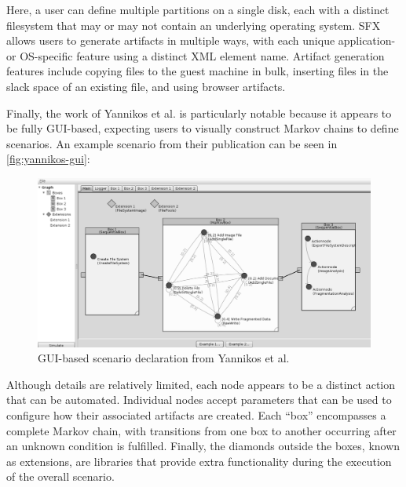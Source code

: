 \documentclass[letterpaper,12pt]{report}
\begin{document}
Here, a user can define multiple partitions on a single disk, each with
a distinct filesystem that may or may not contain an underlying
operating system. SFX allows users to generate artifacts in multiple
ways, with each unique application- or OS-specific feature using a
distinct XML element name. Artifact generation features include copying
files to the guest machine in bulk, inserting files in the slack space
of an existing file, and using browser artifacts.

Finally, the work of Yannikos et al.
\cite{yannikosDataCorporaDigital2014} is particularly notable
because it appears to be fully GUI-based, expecting users to visually
construct Markov chains to define scenarios. An example scenario from
their publication can be seen in \autoref{fig:yannikos-gui}:

\begin{figure}[htbp]
\centering
\includegraphics[width=1\linewidth]{yannikos.png}
\caption{GUI-based scenario declaration from Yannikos et al.
\cite{yannikosDataCorporaDigital2014}}\label{fig:yannikos-gui}
\end{figure}

Although details are relatively limited, each node appears to be a
distinct action that can be automated. Individual nodes accept
parameters that can be used to configure how their associated artifacts
are created. Each ``box'' encompasses a complete Markov chain, with
transitions from one box to another occurring after an unknown condition
is fulfilled. Finally, the diamonds outside the boxes, known as
extensions, are libraries that provide extra functionality during the
execution of the overall scenario.
\end{document}
